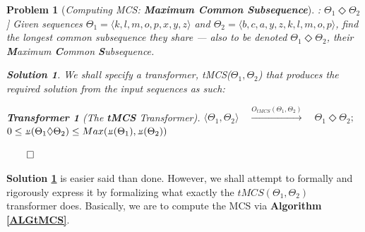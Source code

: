 \documentclass[a4paper, 18pt]{book} %
\newtheorem{transf}{Transformer}
\newtheorem{prob}{Problem}
\newtheorem{soln}{Solution}
\newcommand{\invpi}{\rotatebox[origin=c]{180}{$\pi$}}
\begin{document}
\begin{prob}[\textit{Computing MCS: \textbf{Maximum Common Subsequence}}]: $\Theta_1 \Diamond \Theta_2$] 
\label{PROBMCS}
Given sequences $\Theta_1 = \langle k, l, m, o, p, x, y, z \rangle$ and $\Theta_2 = \langle b, c, a, y, z, k, l, m, o, p \rangle$, find the longest common subsequence they share --- also to be denoted $\Theta_1 \Diamond \Theta_2$, their \textbf{M}aximum \textbf{C}ommon \textbf{S}ubsequence.

\begin{soln}
\label{SOLMCS}
We shall specify a transformer, tMCS($\Theta_1,\Theta_2$) that produces the required solution from the input sequences as such:

\begin{transf}[The \textbf{tMCS} Transformer]
\label{TRANSFMCS}
$\langle \Theta_1,\Theta_2 \rangle  \quad \xrightarrow{O_{tMCS}(\Theta_1,\Theta_2)} \quad \Theta_1 \Diamond \Theta_2;$\\
$0 \leq \invpi(\Theta_1 \Diamond \Theta_2) \leq Max(\invpi(\Theta_1), \invpi(\Theta_2))$
\end{transf}
$\qed$
\end{soln}
\end{prob}

\textbf{Solution \ref{SOLMCS}} is easier said than done. However, we shall attempt to formally and rigorously express it by formalizing what exactly the $tMCS(\Theta_1,\Theta_2)$ transformer does. Basically, we are to compute the MCS via \textbf{Algorithm \ref{ALGtMCS}}.
\end{document}
